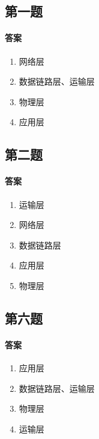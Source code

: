 \documentclass[UTF8]{article}
\begin{document}
\subsection{第一题}
\paragraph{答案}
\begin{enumerate}[a]
    \item 网络层
    \item 数据链路层、运输层
    \item 物理层
    \item 应用层
\end{enumerate}
\subsection{第二题}
\paragraph{答案}
\begin{enumerate}[a]
    \item 运输层
    \item 网络层
    \item 数据链路层
    \item 应用层
    \item 物理层
\end{enumerate}
\subsection{第六题}
\paragraph{答案}
\begin{enumerate}[a]
    \item 应用层
    \item 数据链路层、运输层
    \item 物理层
    \item 运输层
\end{enumerate}
\end{document}

